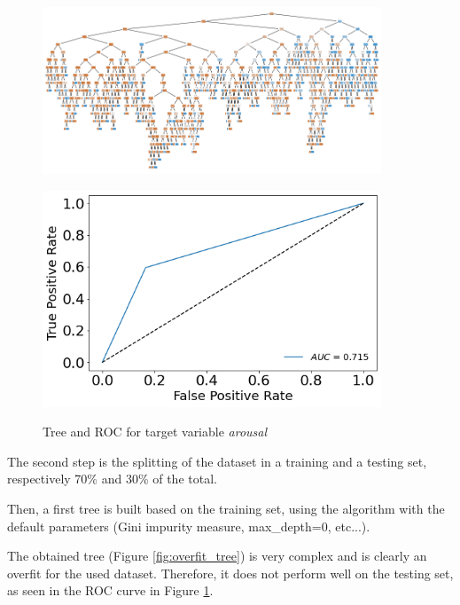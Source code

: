 \documentclass[a4paper,11pt,dvipsnames]{article}
\begin{document}
\begin{figure}[h]
\begin{minipage}{0.7\linewidth}
        \centering
    \includegraphics[width=0.9\textwidth]{overfit_tree_arousal.png}
    \label{fig:overfit_tree}
\end{minipage}
\hfill
    \begin{minipage}{0.3\linewidth}
            \centering
            \includegraphics[width=0.9\textwidth]{arousal_overfit_ROC.png}
            \label{overroc}
    \end{minipage}
    \caption{Tree and ROC for target variable \textit{arousal}}
\end{figure}


The second step is the splitting of the dataset in a training and a testing set, respectively 70\% and 30\% of the total. 

Then, a first tree is built based on the training set, using the algorithm with the default parameters (Gini impurity measure, max\_depth=0, etc...).


The obtained tree (Figure \ref{fig:overfit_tree}) is very complex and is clearly an overfit for the used dataset. Therefore, it does not perform well on the testing set, as seen in the ROC curve in Figure \ref{overroc}.
\end{document}
